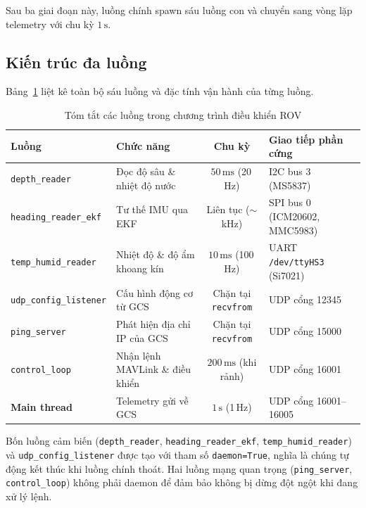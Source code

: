 \documentclass[../DoAn.tex]{subfiles}
\begin{document}
Sau ba giai đoạn này, luồng chính spawn sáu luồng con và chuyển sang
vòng lặp telemetry với chu kỳ $1\,\text{s}$.

\subsection{Kiến trúc đa luồng}

Bảng~\ref{tab:thread_summary} liệt kê toàn bộ sáu luồng và đặc
tính vận hành của từng luồng.

\begin{table}[H]
\centering
\renewcommand{\arraystretch}{1.35}
\begin{tabularx}{\textwidth}{|l|X|c|X|}
\hline
\textbf{Luồng} &
\textbf{Chức năng} &
\textbf{Chu kỳ} &
\textbf{Giao tiếp phần cứng} \\
\hline
\texttt{depth\_reader}       & Đọc độ sâu \& nhiệt độ nước   & $50\,\text{ms}$ (20\,Hz) & I2C bus 3 (MS5837) \\
\texttt{heading\_reader\_ekf} & Tư thế IMU qua EKF             & Liên tục ($\sim$kHz)     & SPI bus 0 (ICM20602, MMC5983) \\
\texttt{temp\_humid\_reader}  & Nhiệt độ \& độ ẩm khoang kín  & $10\,\text{ms}$ (100\,Hz) & UART \texttt{/dev/ttyHS3} (Si7021) \\
\texttt{udp\_config\_listener}& Cấu hình động cơ từ GCS       & Chặn tại \texttt{recvfrom} & UDP cổng 12345 \\
\texttt{ping\_server}        & Phát hiện địa chỉ IP của GCS  & Chặn tại \texttt{recvfrom} & UDP cổng 15000 \\
\texttt{control\_loop}       & Nhận lệnh MAVLink \& điều khiển & $200\,\text{ms}$ (khi rảnh) & UDP cổng 16001 \\
\hline
\textbf{Main thread}         & Telemetry gửi về GCS           & $1\,\text{s}$ (1\,Hz)    & UDP cổng 16001--16005 \\
\hline
\end{tabularx}
\caption{Tóm tắt các luồng trong chương trình điều khiển ROV}
\label{tab:thread_summary}
\end{table}

Bốn luồng cảm biến (\texttt{depth\_reader}, \texttt{heading\_reader\_ekf},
\texttt{temp\_humid\_reader}) và \texttt{udp\_config\_listener} được
tạo với tham số \texttt{daemon=True}, nghĩa là chúng tự động kết thúc
khi luồng chính thoát. Hai luồng mạng quan trọng
(\texttt{ping\_server}, \texttt{control\_loop}) không phải daemon để
đảm bảo không bị dừng đột ngột khi đang xử lý lệnh.
\end{document}
